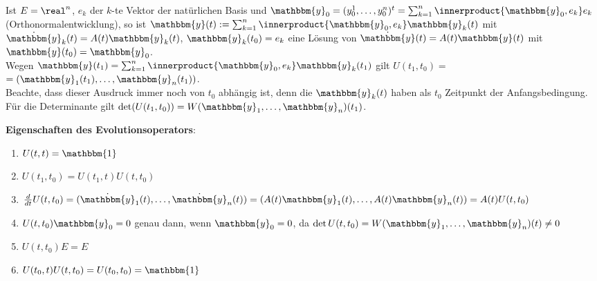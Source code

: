 \linie

Ist $E = \real^n$, $e_k$ der $k$-te Vektor der natürlichen Basis und
$\mathbbm{y}_0 = (y_0^1, \dotsc, y_0^n)^t =
\sum_{k=1}^n \innerproduct{\mathbbm{y}_0, e_k} e_k$
(Orthonormalentwicklung), so ist
$\mathbbm{y}(t) := \sum_{k=1}^n \innerproduct{\mathbbm{y}_0, e_k} \mathbbm{y}_k(t)$
mit $\dot{\mathbbm{y}}_k(t) = A(t) \mathbbm{y}_k(t)$,
$\mathbbm{y}_k(t_0) = e_k$ eine Lösung von
$\dot{\mathbbm{y}}(t) = A(t) \mathbbm{y}(t)$ mit
$\mathbbm{y}(t_0) = \mathbbm{y}_0$. \\
Wegen $\mathbbm{y}(t_1) =
\sum_{k=1}^n \innerproduct{\mathbbm{y}_0, e_k} \mathbbm{y}_k(t_1)$ gilt
$U(t_1, t_0) =$
 $= (\mathbbm{y}_1(t_1), \dotsc, \mathbbm{y}_n(t_1))$. \\
Beachte, dass dieser Ausdruck immer noch von $t_0$ abhängig ist, denn
die $\mathbbm{y}_k(t)$ haben als $t_0$ Zeitpunkt der Anfangsbedingung.
Für die Determinante gilt
$\det(U(t_1, t_0)) = W(\mathbbm{y}_1, \dotsc, \mathbbm{y}_n)(t_1)$.

\linie

\textbf{Eigenschaften des Evolutionsoperators}:
\begin{enumerate}
    \item
    $U(t, t) = \mathbbm{1}$

    \item
    $U(t_1, t_0) = U(t_1, t) U(t, t_0)$

    \item
    $\frac{d}{dt} U(t, t_0) =
    (\dot{\mathbbm{y}}_1(t), \dotsc, \dot{\mathbbm{y}}_n(t)) =
    (A(t) \mathbbm{y}_1(t), \dotsc, A(t) \mathbbm{y}_n(t)) =
    A(t) U(t, t_0)$

    \item
    $U(t, t_0) \mathbbm{y}_0 = 0$ genau dann, wenn $\mathbbm{y}_0 = 0$, da
    $\det U(t, t_0) =
    W(\mathbbm{y}_1, \dotsc, \mathbbm{y}_n)(t) \not= 0$

    \item
    $U(t, t_0) E = E$

    \item
    $U(t_0, t) U(t, t_0) = U(t_0, t_0) = \mathbbm{1}$
\end{enumerate}

\linie


